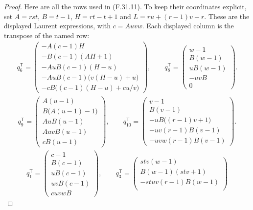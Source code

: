 \begin{proof}
Here are all the rows used in (F.31.11).
To keep their coordinates explicit, set
$A=rst$, $B=t-1$, $H=rt-t+1$ and
$L=ru+(r-1)v-r$. These are the displayed
Laurent expressions, with $c=Auvw$.
Each displayed column is the transpose
of the named row:
\[
 \begin{gathered}
 q_6^{\mathsf T}=
 \begin{pmatrix}
 -A(c-1)H\\-B(c-1)(AH+1)\\
 -AuB(c-1)(H-u)\\-AuB(c-1)\bigl(v(H-u)+u\bigr)\\
 -cB\bigl((c-1)(H-u)+cu/v\bigr)
 \end{pmatrix},\qquad
 q_8^{\mathsf T}=
 \begin{pmatrix}w-1\\B(w-1)\\uB(w-1)\\-uvB\\0\end{pmatrix}.
 \end{gathered}                                                \tag{F.31.12}
\]
\[
 \begin{gathered}
 q_9^{\mathsf T}=
 \begin{pmatrix}
 A(u-1)\\B\bigl(A(u-1)-1\bigr)\\AuB(u-1)\\AuvB(u-1)\\cB(u-1)
 \end{pmatrix},\qquad
 q_{10}^{\mathsf T}=
 \begin{pmatrix}
 v-1\\B(v-1)\\-uB\bigl((r-1)v+1\bigr)\\
 -uv(r-1)B(v-1)\\-uvw(r-1)B(v-1)
 \end{pmatrix}.
 \end{gathered}                                                \tag{F.31.13}
\]
\[
 \begin{gathered}
 q_1^{\mathsf T}=
 \begin{pmatrix}c-1\\B(c-1)\\uB(c-1)\\uvB(c-1)\\cuvwB\end{pmatrix},\qquad
 q_3^{\mathsf T}=
 \begin{pmatrix}
 stv(w-1)\\B(w-1)(stv+1)\\-stuv(r-1)B(w-1)\\

\end{pmatrix}
\end{gathered}\]
\end{proof}
